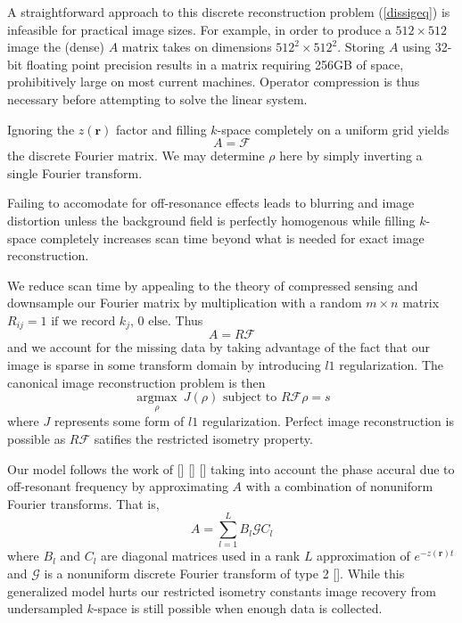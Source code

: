 \documentclass[11pt]{amsart}
\theoremstyle{remark}
\begin{document}
A straightforward approach to this discrete reconstruction problem (\ref{dissigeq}) is infeasible for practical image sizes. For example, in order to produce a $512 \times 512$ image the (dense) $A$ matrix takes on dimensions $512^2 \times 512^2$. Storing $A$ using 32-bit floating point precision results in a matrix requiring 256GB of space, prohibitively large on most current machines. Operator compression is thus necessary before attempting to solve the linear system.

Ignoring the $z(\mathbf{r})$ factor and filling $k$-space completely on a uniform grid yields
\begin{equation}
A = \mathcal{F}
\end{equation}
the discrete Fourier matrix. We may determine $\rho$ here by simply inverting a single Fourier transform.

Failing to accomodate for off-resonance effects leads to blurring and image distortion unless the background field is perfectly homogenous while filling $k$-space completely increases scan time beyond what is needed for exact image reconstruction.

We reduce scan time by appealing to the theory of compressed sensing and downsample our Fourier matrix by multiplication with a random $m \times n$ matrix $R_{ij} = 1 \text{ if we record } k_j \text{, } 0 \text{ else}$. Thus
\begin{equation}
A = R\mathcal{F}
\end{equation}
and we account for the missing data by taking advantage of the fact that our image is sparse in some transform domain by introducing $l1$ regularization. The canonical image reconstruction problem is then
\begin{equation}\label{csequ}
\underset{\rho}{\operatorname{argmax}} \: J(\rho)  \text{ subject to } R\mathcal{F} \rho = s
\end{equation}
where $J$ represents some form of $l1$ regularization. Perfect image reconstruction is possible as $R\mathcal{F}$ satifies the restricted isometry property.

Our model follows the work of [] [] [] taking into account the phase accural due to off-resonant frequency by approximating $A$ with a combination of nonuniform Fourier transforms. That is,
\begin{equation}\label{aprox}
A = \sum_{l=1}^L B_l \mathcal{G} C_l 
\end{equation}
where $B_l$ and $C_l$ are diagonal matrices used in a rank $L$ approximation of $e^{-z(\mathbf{r})t}$ and $\mathcal{G}$ is a nonuniform discrete Fourier transform of type 2 []. While this generalized model hurts our restricted isometry constants image recovery from undersampled $k$-space is still possible when enough data is collected.
\end{document}
